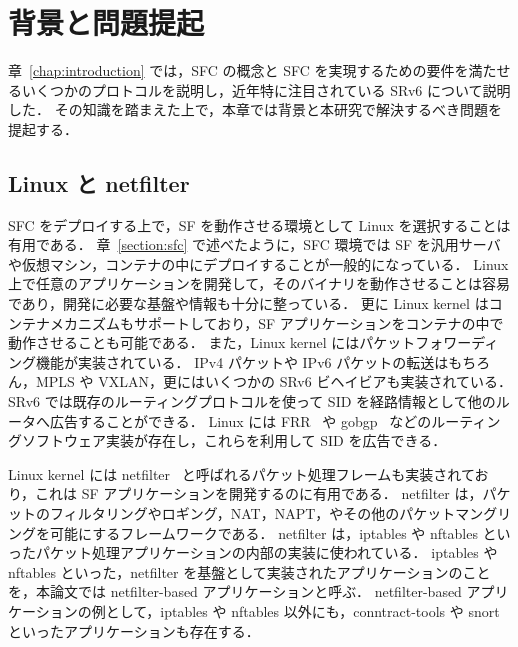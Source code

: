 \chapter{背景と問題提起}
\label{chap:related_works}
章~\ref*{chap:introduction} では，SFC の概念と SFC を実現するための要件を満たせるいくつかのプロトコルを説明し，近年特に注目されている SRv6 について説明した．
その知識を踏まえた上で，本章では背景と本研究で解決するべき問題を提起する．

\section{Linux と netfilter}
\label{section:linux-and-netfilter}
SFC をデプロイする上で，SF を動作させる環境として Linux を選択することは有用である．
章~\ref*{section:sfc} で述べたように，SFC 環境では SF を汎用サーバや仮想マシン，コンテナの中にデプロイすることが一般的になっている．
Linux 上で任意のアプリケーションを開発して，そのバイナリを動作させることは容易であり，開発に必要な基盤や情報も十分に整っている．
更に Linux kernel はコンテナメカニズムもサポートしており，SF アプリケーションをコンテナの中で動作させることも可能である．
また，Linux kernel にはパケットフォワーディング機能が実装されている．
IPv4 パケットや IPv6 パケットの転送はもちろん，MPLS や VXLAN，更にはいくつかの SRv6 ビヘイビアも実装されている．
SRv6 では既存のルーティングプロトコルを使って SID を経路情報として他のルータへ広告することができる．
Linux には FRR~\cite{frr} や gobgp~\cite{gobgp} などのルーティングソフトウェア実装が存在し，これらを利用して SID を広告できる．

Linux kernel には netfilter~\cite*{netfilter} と呼ばれるパケット処理フレームも実装されており，これは SF アプリケーションを開発するのに有用である．
netfilter は，パケットのフィルタリングやロギング，NAT，NAPT，やその他のパケットマングリングを可能にするフレームワークである．
netfilter は，iptables や nftables といったパケット処理アプリケーションの内部の実装に使われている．
iptables や nftables といった，netfilter を基盤として実装されたアプリケーションのことを，本論文では netfilter-based アプリケーションと呼ぶ．
netfilter-based アプリケーションの例として，iptables や nftables 以外にも，conntract-tools\cite{conntract-tools} や snort\cite{snort} といったアプリケーションも存在する．

